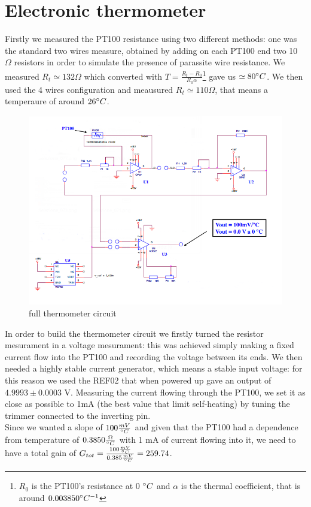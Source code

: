 \section{Electronic thermometer}
Firstly we measured the PT100 resistance using two different methods: one was the standard two wires measure, obtained by adding on each PT100 end two 10 $\Omega$ resistors in order to simulate the presence of parassite wire resistance. We measured $R_t \simeq 132\Omega$ which converted with $T = \frac{R_t - R_0}{R_0 \alpha}$\footnote{ $R_0$ is the PT100's resistance at 0 $\degree C$ and $\alpha$ is the thermal coefficient, that is around $0.003850 \degree C^{-1}$  }
gave us $\simeq 80\degree C$. We then used the 4 wires configuration and meausured $R_t \simeq 110 \Omega$, that means a temperaure of around $ 26 \degree C$.
\begin{figure}[H]
\centering
\includegraphics[width=.7\textwidth]{6/circuit.png}
\caption{full thermometer circuit}
\end{figure}
In order to build the thermometer circuit we firstly turned the resistor mesurament in a voltage mesurament: this was achieved simply making a fixed current flow into the PT100 and recording the voltage between its ends. We then needed a highly stable current generator, which means a stable input voltage: for this  reason we used the REF02 that when powered up gave an output of $4.9993 \pm 0.0003$ V. Measuring the current flowing through the PT100, we set it as close as possible to 1mA (the best value that limit self-heating) by tuning the trimmer connected to the inverting pin.\\
Since we wanted a slope of $100 \frac{mV}{\degree C}$ and given that the PT100 had a dependence from temperature of $0.3850 \frac{\Omega}{\degree C}$ with 1 mA of current flowing into it, we need to have a total gain of $G_{tot} = \frac{100 \frac{mV}{\degree C}}{0.385 \frac{mV}{\degree C}} = 259.74$.\\
